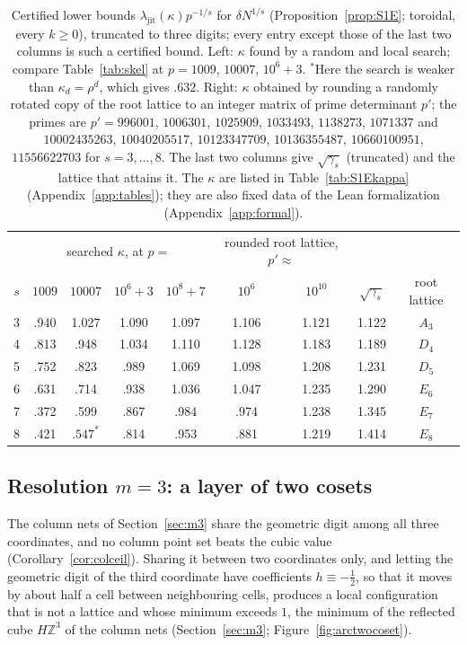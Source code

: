 \documentclass[11pt]{amsart}
\theoremstyle{definition}
\theoremstyle{plain}
\newcommand{\Z}{\mathbb{Z}}
\begin{document}
\begin{table}[tbp]
\centering\small\setlength{\tabcolsep}{4pt}
\begin{tabular}{@{}ccccccccc@{}}
\toprule
& \multicolumn{4}{c}{searched $\kappa$, at $p=$} & \multicolumn{2}{c}{rounded root lattice, $p'\approx$} & & \\
$s$ & $1009$ & $10007$ & $10^6{+}3$ & $10^8{+}7$ & $10^6$ & $10^{10}$ & $\sqrt{\gamma_s}$ & root lattice\\
\midrule
3 & .940 & 1.027 & 1.090 & 1.097 & 1.106 & 1.121 & 1.122 & $A_3$\\
4 & .813 & .948 & 1.034 & 1.110 & 1.128 & 1.183 & 1.189 & $D_4$\\
5 & .752 & .823 & .989 & 1.069 & 1.098 & 1.208 & 1.231 & $D_5$\\
6 & .631 & .714 & .938 & 1.036 & 1.047 & 1.235 & 1.290 & $E_6$\\
7 & .372 & .599 & .867 & .984 & .974 & 1.238 & 1.345 & $E_7$\\
8 & .421 & $.547^*$ & .814 & .953 & .881 & 1.219 & 1.414 & $E_8$\\
\bottomrule
\end{tabular}
\medskip
\caption{Certified lower bounds $\lambda_{\mathrm{jit}}(\kappa)p^{-1/s}$ for $\delta N^{1/s}$ (Proposition~\ref{prop:S1E}; toroidal, every $k\ge0$), truncated to three digits; every entry except those of the last two columns is such a certified bound. Left: $\kappa$ found by a random and local search; compare Table~\ref{tab:skel} at $p=1009$, $10007$, $10^6{+}3$. ${}^*$Here the search is weaker than $\kappa_d=\rho^d$, which gives $.632$. Right: $\kappa$ obtained by rounding a randomly rotated copy of the root lattice to an integer matrix of prime determinant $p'$; the primes are $p'=996001$, $1006301$, $1025909$, $1033493$, $1138273$, $1071337$ and $10002435263$, $10040205517$, $10123347709$, $10136355487$, $10660100951$, $11556622703$ for $s=3,\dots,8$. The last two columns give $\sqrt{\gamma_s}$ (truncated) and the lattice that attains it. The $\kappa$ are listed in Table~\ref{tab:S1Ekappa} (Appendix~\ref{app:tables}); they are also fixed data of the Lean formalization (Appendix~\ref{app:formal}).}
\label{tab:S1E}
\end{table}

\subsection{Resolution \texorpdfstring{$m=3$}{m=3}: a layer of two cosets}\label{sec:twocoset}
The column nets of Section~\ref{sec:m3} share the geometric digit among all three coordinates, and no column point set beats the cubic value (Corollary~\ref{cor:colceil}). Sharing it between two coordinates only, and letting the geometric digit of the third coordinate have coefficients $h\equiv-\frac12$, so that it moves by about half a cell between neighbouring cells, produces a local configuration that is not a lattice and whose minimum exceeds $1$, the minimum of the reflected cube $H\Z^3$ of the column nets (Section~\ref{sec:m3}; Figure~\ref{fig:arctwocoset}).
\end{document}
